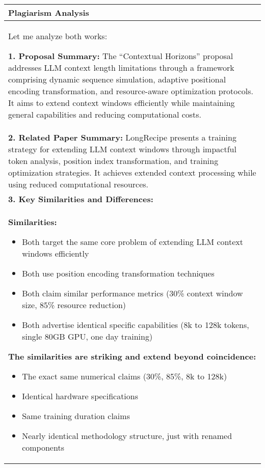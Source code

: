 \begin{table*}[t]
    \centering
    \small
    \renewcommand{\arraystretch}{1.4}
    \begin{tabular}{|p{}|}
        \hline
        \textbf{Plagiarism Analysis} \\
        \hline
        Let me analyze both works:

        \textbf{1. Proposal Summary:} The ``Contextual Horizons'' proposal addresses LLM context length limitations through a framework comprising dynamic sequence simulation, adaptive positional encoding transformation, and resource-aware optimization protocols. It aims to extend context windows efficiently while maintaining general capabilities and reducing computational costs.
        \\
        \textbf{2. Related Paper Summary:} LongRecipe presents a training strategy for extending LLM context windows through impactful token analysis, position index transformation, and training optimization strategies. It achieves extended context processing while using reduced computational resources.
        \\
        \textbf{3. Key Similarities and Differences:}\\
        \textbf{Similarities:}
        \begin{itemize}
        \item Both target the same core problem of extending LLM context windows efficiently
        \item Both use position encoding transformation techniques
        \item Both claim similar performance metrics (30\% context window size, 85\% resource reduction)
        \item Both advertise identical specific capabilities (8k to 128k tokens, single 80GB GPU, one day training)
        \end{itemize}

        \textbf{The similarities are striking and extend beyond coincidence:}
        \begin{itemize}
        \item The exact same numerical claims (30\%, 85\%, 8k to 128k)
        \item Identical hardware specifications
        \item Same training duration claims
        \item Nearly identical methodology structure, just with renamed components
        \end{itemize}


\end{tabular}
\end{table*}
